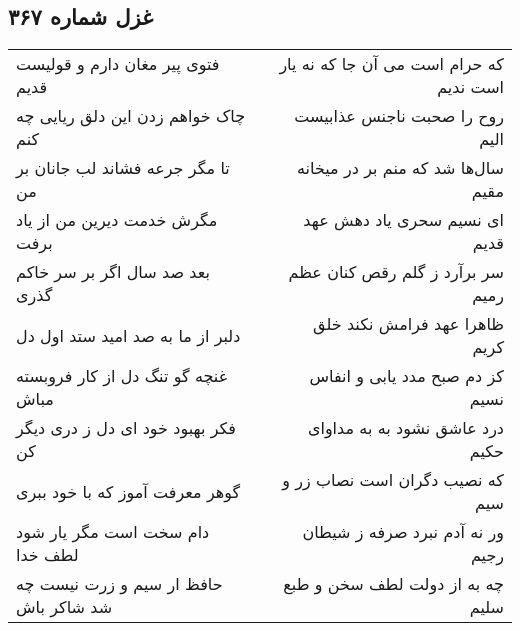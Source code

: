 \begin{center}
\section*{غزل شماره ۳۶۷}
\label{sec:sh367}
\begin{longtable}{l p{0.5cm} r}
فتوی پیر مغان دارم و قولیست قدیم
&&
که حرام است می آن جا که نه یار است ندیم
\\
چاک خواهم زدن این دلق ریایی چه کنم
&&
روح را صحبت ناجنس عذابیست الیم
\\
تا مگر جرعه فشاند لب جانان بر من
&&
سال‌ها شد که منم بر در میخانه مقیم
\\
مگرش خدمت دیرین من از یاد برفت
&&
ای نسیم سحری یاد دهش عهد قدیم
\\
بعد صد سال اگر بر سر خاکم گذری
&&
سر برآرد ز گلم رقص کنان عظم رمیم
\\
دلبر از ما به صد امید ستد اول دل
&&
ظاهرا عهد فرامش نکند خلق کریم
\\
غنچه گو تنگ دل از کار فروبسته مباش
&&
کز دم صبح مدد یابی و انفاس نسیم
\\
فکر بهبود خود ای دل ز دری دیگر کن
&&
درد عاشق نشود به به مداوای حکیم
\\
گوهر معرفت آموز که با خود ببری
&&
که نصیب دگران است نصاب زر و سیم
\\
دام سخت است مگر یار شود لطف خدا
&&
ور نه آدم نبرد صرفه ز شیطان رجیم
\\
حافظ ار سیم و زرت نیست چه شد شاکر باش
&&
چه به از دولت لطف سخن و طبع سلیم
\\
\end{longtable}
\end{center}
